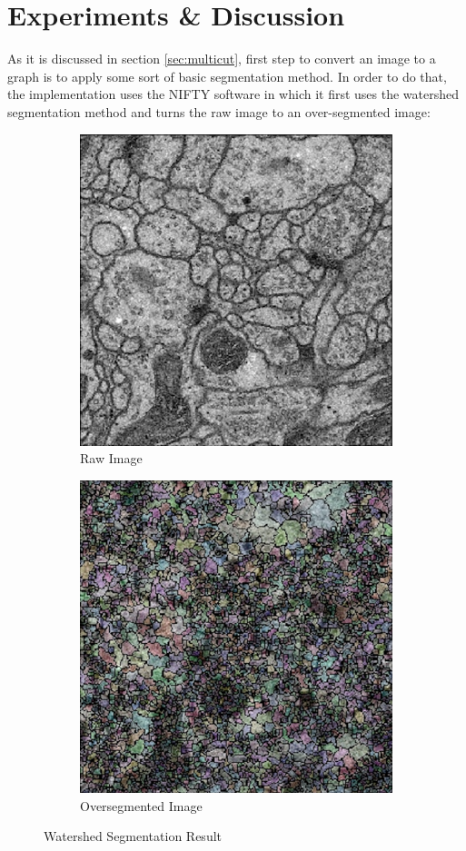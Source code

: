 \documentclass[12pt, a4paper]{scrartcl}
\begin{document}
\section{Experiments \& Discussion}
\label{sec:expe}

As it is discussed in section \ref{sec:multicut}, first step to convert an image to a graph is to apply some sort of basic segmentation method. In order to do that, the implementation uses the NIFTY software \citep{niftyDoc} in which it first uses the watershed segmentation method and turns the raw image to an over-segmented image:
\begin{figure}[H]
\centering
\begin{subfigure}{.45\textwidth}
  \centering
  \includegraphics[width=.8\linewidth]{os1}
  \caption{Raw Image}
  \label{fig:os1}
\end{subfigure}%
\begin{subfigure}{.45\textwidth}
  \centering
  \includegraphics[width=.8\linewidth]{os2}
  \caption{Oversegmented Image}
  \label{fig:os2}
\end{subfigure}

\label{fig:oversegment}
\caption{Watershed Segmentation Result}
\end{figure}
\end{document}
